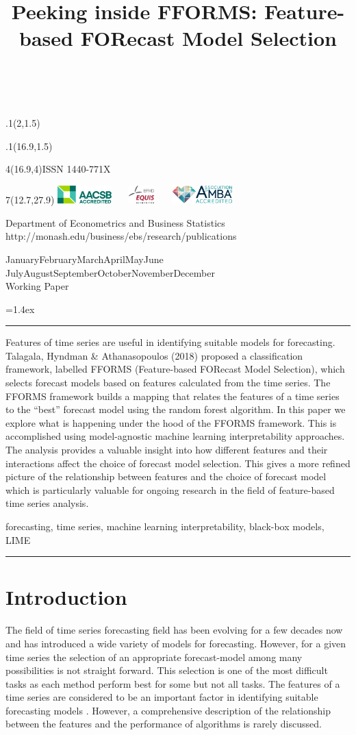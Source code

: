 \documentclass[11pt,a4paper,]{article}
\title{Peeking inside FFORMS: Feature-based FORecast Model Selection}
\date{\sf\Date~\Month~\Year}
\makeatletter
\def\Date{\number\day}
\def\Month{\ifcase\month\or
 January\or February\or March\or April\or May\or June\or
 July\or August\or September\or October\or November\or December\fi}
\def\Year{\number\year}
\def\showjel{{\large\textsf{\textbf{JEL classification:}}~\@jel}}
\def\cover{{\sffamily\setcounter{page}{0}
        \thispagestyle{empty}
        \placefig{2}{1.5}{width=5cm}{monash2}
        \placefig{16.9}{1.5}{width=2.1cm}{MBusSchool}
        \begin{textblock}{4}(16.9,4)ISSN 1440-771X\end{textblock}
        \begin{textblock}{7}(12.7,27.9)\hfill
        \includegraphics[height=0.7cm]{AACSB}~~~
        \includegraphics[height=0.7cm]{EQUIS}~~~
        \includegraphics[height=0.7cm]{AMBA}
        \end{textblock}
        \vspace*{2cm}
        \begin{center}\Large
        Department of Econometrics and Business Statistics\\[.5cm]
        \footnotesize http://monash.edu/business/ebs/research/publications
        \end{center}\vspace{2cm}
        \begin{center}
        \fbox{\parbox{14cm}{\begin{onehalfspace}\centering\Huge\vspace*{0.3cm}
                \textsf{\textbf{\expandafter{\@title}}}\vspace{1cm}\par
                \LARGE\@author\end{onehalfspace}
        }}
        \end{center}
        \vfill
                \begin{center}\Large
                \Month~\Year\\[1cm]
                Working Paper \@wp
        \end{center}\vspace*{2cm}}}
\def\pageone{{\sffamily\setstretch{1}%
        \thispagestyle{empty}%
        \vbox to \textheight{%
        \raggedright\baselineskip=1.2cm
     {\fontsize{24.88}{30}\sffamily\textbf{\expandafter{\@title}}}
        \vspace{2cm}\par
        \hspace{1cm}\parbox{14cm}{\sffamily\large\@addresses}\vspace{1cm}\vfill
        \hspace{1cm}{\large\Date~\Month~\Year}\\[1cm]
        \hspace{1cm}\showjel\vss}}}
\def\blindtitle{{\sffamily
     \thispagestyle{plain}\raggedright\baselineskip=1.2cm
     {\fontsize{24.88}{30}\sffamily\textbf{\expandafter{\@title}}}\vspace{1cm}\par
        }}
\def\titlepage{{\cover\newpage\pageone\newpage\blindtitle}}
\let\maketitle\titlepage
\newenvironment{keywords}{\par\vspace{0.5cm}\noindent{\sffamily\textbf{Keywords:}}}{\vspace{0.25cm}\par\hrule\vspace{0.5cm}\par}
\renewenvironment{abstract}{\begin{minipage}{\textwidth}\parskip=1.4ex\noindent
\hrule\vspace{0.1cm}\par{\sffamily\textbf{\abstractname}}\newline}
  {\end{minipage}}
\def\placefig#1#2#3#4{\begin{textblock}{.1}(#1,#2)\rlap{\texttt{[image: \#4]}}\end{textblock}}
\makeatother
\begin{document}
\maketitle
\begin{abstract}
Features of time series are useful in identifying suitable models for
forecasting. Talagala, Hyndman \& Athanasopoulos (2018) proposed a
classification framework, labelled FFORMS (Feature-based FORecast Model
Selection), which selects forecast models based on features calculated
from the time series. The FFORMS framework builds a mapping that relates
the features of a time series to the ``best'' forecast model using the
random forest algorithm. In this paper we explore what is happening
under the hood of the FFORMS framework. This is accomplished using
model-agnostic machine learning interpretability approaches. The
analysis provides a valuable insight into how different features and
their interactions affect the choice of forecast model selection. This
gives a more refined picture of the relationship between features and
the choice of forecast model which is particularly valuable for ongoing
research in the field of feature-based time series analysis.
\end{abstract}
\begin{keywords}
forecasting, time series, machine learning interpretability, black-box
models, LIME
\end{keywords}

\section{Introduction}\label{intro}

The field of time series forecasting field has been evolving for a few
decades now and has introduced a wide variety of models for forecasting.
However, for a given time series the selection of an appropriate
forecast-model among many possibilities is not straight forward. This
selection is one of the most difficult tasks as each method perform best
for some but not all tasks. The features of a time series are considered
to be an important factor in identifying suitable forecasting models
\autocites{collopy1992rule}{meade2000evidence}{makridakis2000m3}{wang2009rule}.
However, a comprehensive description of the relationship between the
features and the performance of algorithms is rarely discussed.
\end{document}
